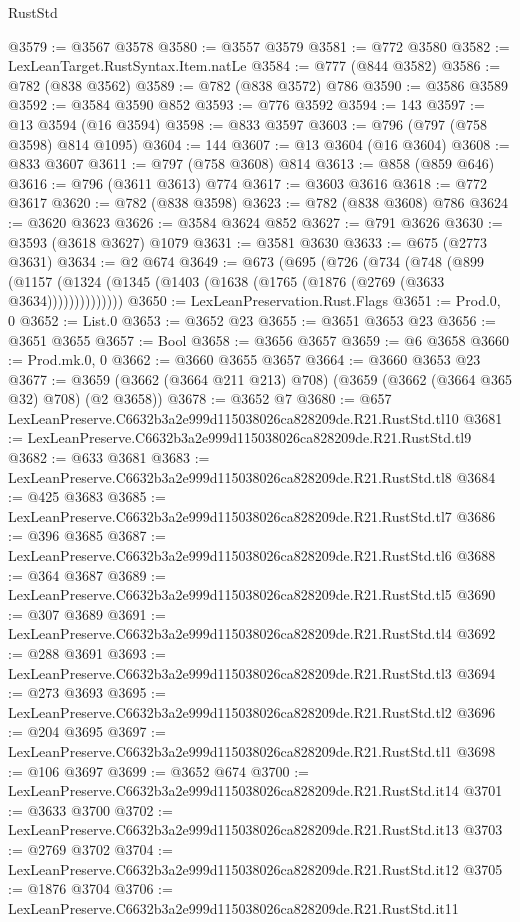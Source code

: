 \begin{lexlean}{RustStd}
\begin{coremodule}
@3579 := @3567 @3578
@3580 := @3557 @3579
@3581 := @772 @3580
@3582 := LexLeanTarget.RustSyntax.Item.natLe
@3584 := @777 (@844 @3582)
@3586 := @782 (@838 @3562)
@3589 := @782 (@838 @3572) @786
@3590 := @3586 @3589
@3592 := @3584 @3590 @852
@3593 := @776 @3592
@3594 := 143
@3597 := @13 @3594 (@16 @3594)
@3598 := @833 @3597
@3603 := @796 (@797 (@758 @3598) @814 @1095)
@3604 := 144
@3607 := @13 @3604 (@16 @3604)
@3608 := @833 @3607
@3611 := @797 (@758 @3608) @814
@3613 := @858 (@859 @646)
@3616 := @796 (@3611 @3613) @774
@3617 := @3603 @3616
@3618 := @772 @3617
@3620 := @782 (@838 @3598)
@3623 := @782 (@838 @3608) @786
@3624 := @3620 @3623
@3626 := @3584 @3624 @852
@3627 := @791 @3626
@3630 := @3593 (@3618 @3627) @1079
@3631 := @3581 @3630
@3633 := @675 (@2773 @3631)
@3634 := @2 @674
@3649 := @673
    (@695
      (@726
        (@734
          (@748
            (@899 (@1157 (@1324 (@1345 (@1403 (@1638 (@1765 (@1876 (@2769 (@3633 @3634))))))))))))))
@3650 := LexLeanPreservation.Rust.Flags
@3651 := Prod.{0, 0}
@3652 := List.{0}
@3653 := @3652 @23
@3655 := @3651 @3653 @23
@3656 := @3651 @3655
@3657 := Bool
@3658 := @3656 @3657
@3659 := @6 @3658
@3660 := Prod.mk.{0, 0}
@3662 := @3660 @3655 @3657
@3664 := @3660 @3653 @23
@3677 := @3659 (@3662 (@3664 @211 @213) @708) (@3659 (@3662 (@3664 @365 @32) @708) (@2 @3658))
@3678 := @3652 @7
@3680 := @657 LexLeanPreserve.C6632b3a2e999d115038026ca828209de.R21.RustStd.tl10
@3681 := LexLeanPreserve.C6632b3a2e999d115038026ca828209de.R21.RustStd.tl9
@3682 := @633 @3681
@3683 := LexLeanPreserve.C6632b3a2e999d115038026ca828209de.R21.RustStd.tl8
@3684 := @425 @3683
@3685 := LexLeanPreserve.C6632b3a2e999d115038026ca828209de.R21.RustStd.tl7
@3686 := @396 @3685
@3687 := LexLeanPreserve.C6632b3a2e999d115038026ca828209de.R21.RustStd.tl6
@3688 := @364 @3687
@3689 := LexLeanPreserve.C6632b3a2e999d115038026ca828209de.R21.RustStd.tl5
@3690 := @307 @3689
@3691 := LexLeanPreserve.C6632b3a2e999d115038026ca828209de.R21.RustStd.tl4
@3692 := @288 @3691
@3693 := LexLeanPreserve.C6632b3a2e999d115038026ca828209de.R21.RustStd.tl3
@3694 := @273 @3693
@3695 := LexLeanPreserve.C6632b3a2e999d115038026ca828209de.R21.RustStd.tl2
@3696 := @204 @3695
@3697 := LexLeanPreserve.C6632b3a2e999d115038026ca828209de.R21.RustStd.tl1
@3698 := @106 @3697
@3699 := @3652 @674
@3700 := LexLeanPreserve.C6632b3a2e999d115038026ca828209de.R21.RustStd.it14
@3701 := @3633 @3700
@3702 := LexLeanPreserve.C6632b3a2e999d115038026ca828209de.R21.RustStd.it13
@3703 := @2769 @3702
@3704 := LexLeanPreserve.C6632b3a2e999d115038026ca828209de.R21.RustStd.it12
@3705 := @1876 @3704
@3706 := LexLeanPreserve.C6632b3a2e999d115038026ca828209de.R21.RustStd.it11

\end{coremodule}
\end{lexlean}
